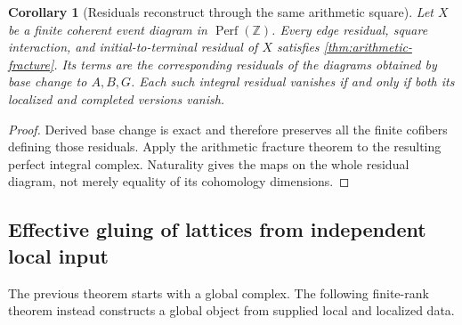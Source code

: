 \documentclass[11pt]{article}
\newtheorem{corollary}[theorem]{Corollary}
\theoremstyle{definition}
\theoremstyle{remark}
\begin{document}
\begin{corollary}[Residuals reconstruct through the same arithmetic square]\label{cor:residual-fracture}
Let $X$ be a finite coherent event diagram in $\operatorname{Perf}(\mathbb Z)$. Every edge residual, square interaction, and initial-to-terminal residual of $X$ satisfies \cref{thm:arithmetic-fracture}. Its terms are the corresponding residuals of the diagrams obtained by base change to $A,B,G$. Each such integral residual vanishes if and only if both its localized and completed versions vanish.
\end{corollary}
\begin{proof}
Derived base change is exact and therefore preserves all the finite cofibers defining those residuals. Apply the arithmetic fracture theorem to the resulting perfect integral complex. Naturality gives the maps on the whole residual diagram, not merely equality of its cohomology dimensions.
\end{proof}

\subsection{Effective gluing of lattices from independent local input}

The previous theorem starts with a global complex. The following finite-rank theorem instead constructs a global object from supplied local and localized data.
\end{document}
